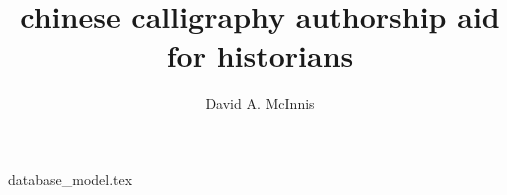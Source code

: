 \documentclass{ewuthesis}
\begin{document}
    \title{chinese calligraphy authorship aid for historians}
    \author{David A. McInnis}    
    \mainmatter
    {database_model.tex}
    
    
    
    
\end{document}
